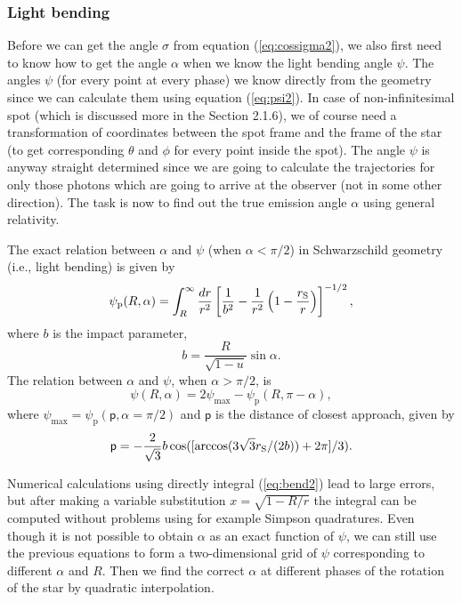 \documentclass{wihuri}
\def\rg{r_{\rm S}} %
\def\be{\begin{equation}}
\def\ee{\end{equation}}
\def\rg{r_{\rm S}} %
\begin{document}
\subsubsection{Light bending}

Before we can get the angle $\sigma$ from equation (\ref{eq:cossigma2}), we also first need to know how to get the angle $\alpha$ when we know the light bending angle $\psi$. The angles $\psi$ (for every point at every phase) we know directly from the geometry since we can calculate them using equation (\ref{eq:psi2}). In case of non-infinitesimal spot (which is discussed more in the Section 2.1.6), we of course need a  transformation of coordinates between the spot frame and the frame of the star (to get corresponding $\theta$ and $\phi$ for every point inside the spot). The angle $\psi$ is anyway straight determined since we are going to calculate the trajectories for only those photons which are going to arrive at the observer (not in some other direction). The task is now to find out the true emission angle $\alpha$ using general relativity. 

The exact relation between $\alpha$ and $\psi$ (when $\alpha < \pi/2$) in Schwarzschild geometry (i.e., light bending) is given by \cite{mtw}%
\be \label{eq:bend2}
  \psi_{\mathrm{p}}(R,\alpha)=\int_R^{\infty} \frac{dr}{r^2} \left[ \frac{1}{b^2} -
       \frac{1}{r^2}\left( 1- \frac{\rg}{r}\right)\right]^{-1/2} ,
\ee
where $b$ is the impact parameter,
\be \label{eq:impact2}
  b=\frac{R}{\sqrt{1-u}} \sin\alpha .
\ee
The relation between  $\alpha$ and $\psi$, when $\alpha > \pi/2$, is 
\be 
\psi(R,\alpha)=2\psi_{\max}-\psi_{\mathrm{p}}(R,\pi-\alpha),
\ee 
where $\psi_{\max} = \psi_{\mathrm{p}}(\mathsf{p},\alpha=\pi/2)$ and $\mathsf{p}$ is the distance of closest approach, given by
\be
\mathsf{p} = -\frac{2}{\sqrt{3}}b\cos([\arccos(3\sqrt{3}\rg/(2b))+2\pi]/3).
\ee


Numerical calculations using directly integral (\ref{eq:bend2}) lead to large errors, but after making a variable substitution $x = \sqrt{1-R/r}$ the integral can be computed without problems using for example Simpson quadratures. Even though it is not possible to obtain $\alpha$ as an exact function of $\psi$, we can still use the previous equations to form a two-dimensional grid of $\psi$ corresponding to different $\alpha$ and $R$. Then we find the correct $\alpha$ at different phases of the rotation of the star by quadratic interpolation. 
\end{document}
